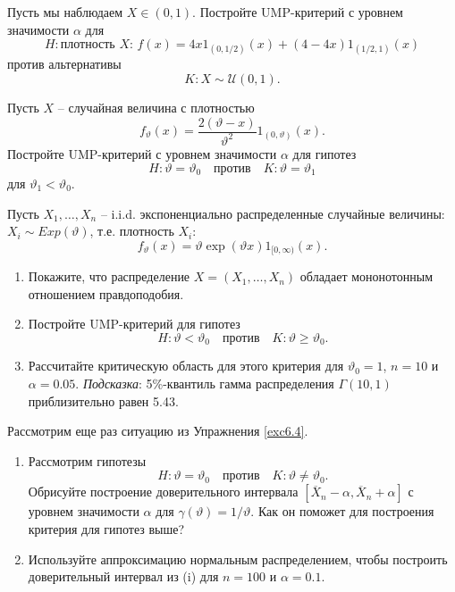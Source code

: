 \begin{exc}
	Пусть мы наблюдаем $X \in (0, 1)$. Постройте UMP-критерий с уровнем значимости $\alpha$ для
	\[H:\text{плотность $X$: } f(x) = 4x1_{(0, 1/2)}(x) + (4 - 4x)1_{(1/2, 1)}(x) \]
	против альтернативы
	\[ K: X \sim \mathcal{U}(0, 1).\]
\end{exc}

\begin{exc}
	Пусть $X$ -- случайная величина с плотностью
	\[ f_\vartheta(x) = \frac{2(\vartheta - x)}{\vartheta^2}1_{(0, \vartheta)}(x). \]
	Постройте UMP-критерий с уровнем значимости $\alpha$ для гипотез
	\[H: \vartheta = \vartheta_0 \quad \text{против} \quad K:\vartheta = \vartheta_1 \]
	для $\vartheta_1 < \vartheta_0$.
\end{exc}

\begin{exc} \label{exc6.4}
	Пусть $X_1, \dots, X_n$ -- i.i.d. экспоненциально распределенные случайные величины: $X_i \sim Exp(\vartheta)$, т.е. плотность $X_i$:
	\[ f_\vartheta(x) = \vartheta \exp (\vartheta x) 1_{[0, \infty)}(x).  \]
	\begin{enumerate}
		\item Покажите, что распределение $X = (X_1, \dots, X_n)$ обладает мононотонным отношением правдоподобия.
		\item Постройте UMP-критерий для гипотез
		\[H: \vartheta < \vartheta_0 \quad \text{против} \quad K:\vartheta \geq \vartheta_0.  \]
		\item Рассчитайте критическую область для этого критерия для $\vartheta_0 = 1$, $n = 10$ и $\alpha = 0.05$.
		\subitem \textit{Подсказка}: 5\%-квантиль гамма распределения $\Gamma(10, 1)$ приблизительно равен 5.43.
		\end{enumerate}
\end{exc}

\begin{exc}
	Рассмотрим еще раз ситуацию из Упражнения \ref{exc6.4}.
	\begin{enumerate}
		\item Рассмотрим гипотезы
		\[ H:\vartheta = \vartheta_0 \quad \text{против} \quad K:\vartheta \neq \vartheta_0. \]
		Обрисуйте построение доверительного интервала $[\overline{X}_n - \alpha, \overline{X}_n + \alpha]$ с уровнем значимости $\alpha$ для $\gamma(\vartheta) = 1/ \vartheta$. Как он поможет для построения критерия для гипотез выше?
		\item Используйте аппроксимацию нормальным распределением, чтобы построить доверительный интервал из (i) для $n=100$ и $\alpha = 0.1$.
	\end{enumerate}
\end{exc}

